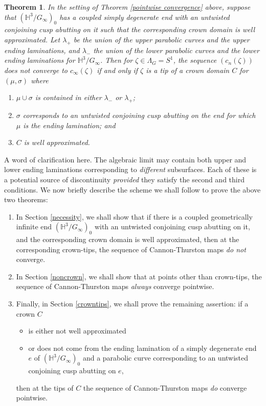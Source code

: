 \documentclass{amsart}
\newtheorem{theorem}{Theorem}[section]
\theoremstyle{definition}
\newcommand\HHH{{\mathbb H}}
\begin{document}
\begin{theorem}
\label{non-continuous}
In the setting of Theorem \ref{pointwise convergence}
above, suppose that $(\HHH^3/G_\infty)_0$ has a coupled simply degenerate end with an untwisted conjoining cusp abutting on it such that the corresponding crown domain is well approximated.
Let $\lambda_+$ be the union of the upper parabolic curves and the upper ending laminations, and $\lambda_-$ the union of the lower parabolic curves and the lower ending laminations for $\HHH^3/G_\infty$.
Then for $\zeta \in \Lambda_G=S^1$, the sequence $(c_n(\zeta))$ does not converge to $c_\infty(\zeta)$ if and only if $\zeta$ is a tip of a crown domain $C$ for $(\mu,  \sigma)$ where 
\begin{enumerate}
\item
$\mu \cup  \sigma$ is contained  in either $\lambda_-$ or $\lambda_+$;
\item
$\sigma$  corresponds to an untwisted conjoining cusp abutting on the end for which $\mu$ is the ending lamination; and
\item 
$C$ is  well approximated.
\end{enumerate}
\end{theorem}
A word of clarification here. The algebraic limit may contain both upper and lower ending laminations corresponding to {\it different} subsurfaces. Each of these is a potential source of discontinuity {\it provided} they satisfy the second and third conditions. 
We now briefly describe the scheme  we shall follow to  prove the above two theorems:

\begin{enumerate}
	\item In Section \ref{necessity}, we shall show that  if there is a coupled  geometrically infinite end  $(\HHH^3/G_\infty)_0$  with an untwisted conjoining cusp abutting on it, and the corresponding crown domain is well approximated, then at the corresponding crown-tips, the sequence of Cannon-Thurston maps {\em do not} converge.
	\item In Section \ref{noncrown}, we shall show that at points other than crown-tips, the sequence of Cannon-Thurston maps {\em always} converge pointwise.
	\item Finally, in Section \ref{crowntips}, we shall prove the remaining assertion: if a crown $C$ 
	\begin{itemize}
		\item is either not well approximated
		\item  or does not come from the ending lamination of a simply degenerate end $e$ of   $(\HHH^3/G_\infty)_0$ and a parabolic curve corresponding to an untwisted conjoining cusp abutting on $e$,
	\end{itemize} 
 then at the tips of $C$ the sequence of Cannon-Thurston maps {\em do} converge pointwise.
\end{enumerate}
\end{document}
